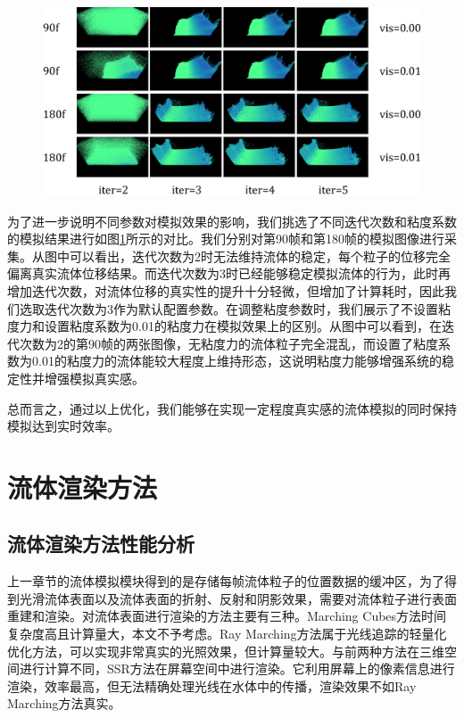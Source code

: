 \begin{figure}[ht]
    \centering
    \includegraphics[width=14cm]{image/simResult.png}
    \label{fig:simResult}
\end{figure}

为了进一步说明不同参数对模拟效果的影响，我们挑选了不同迭代次数和粘度系数的模拟结果进行如图\ref{fig:simResult}所示的对比。我们分别对第90帧和第180帧的模拟图像进行采集。从图中可以看出，迭代次数为2时无法维持流体的稳定，每个粒子的位移完全偏离真实流体位移结果。而迭代次数为3时已经能够稳定模拟流体的行为，此时再增加迭代次数，对流体位移的真实性的提升十分轻微，但增加了计算耗时，因此我们选取迭代次数为3作为默认配置参数。在调整粘度参数时，我们展示了不设置粘度力和设置粘度系数为0.01的粘度力在模拟效果上的区别。从图中可以看到，在迭代次数为2的第90帧的两张图像，无粘度力的流体粒子完全混乱，而设置了粘度系数为0.01的粘度力的流体能较大程度上维持形态，这说明粘度力能够增强系统的稳定性并增强模拟真实感。


总而言之，通过以上优化，我们能够在实现一定程度真实感的流体模拟的同时保持模拟达到实时效率。


\chapter{流体渲染方法}

\section{流体渲染方法性能分析}

上一章节的流体模拟模块得到的是存储每帧流体粒子的位置数据的缓冲区，为了得到光滑流体表面以及流体表面的折射、反射和阴影效果，需要对流体粒子进行表面重建和渲染。对流体表面进行渲染的方法主要有三种。Marching Cubes方法时间复杂度高且计算量大，本文不予考虑。Ray Marching方法属于光线追踪的轻量化优化方法，可以实现非常真实的光照效果，但计算量较大。与前两种方法在三维空间进行计算不同，SSR方法在屏幕空间中进行渲染。它利用屏幕上的像素信息进行渲染，效率最高，但无法精确处理光线在水体中的传播，渲染效果不如Ray Marching方法真实。

